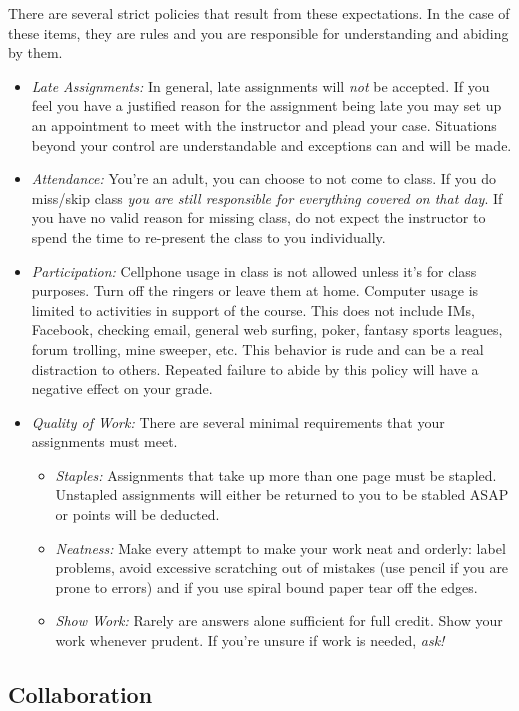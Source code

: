 \documentclass[10pt]{article}
\begin{document}
There are several strict policies that result from these expectations.  In the case of these items, they are rules and you are responsible for understanding and abiding by them.
\begin{itemize}
\item \textit{Late Assignments: }In general, late assignments will \textit{not} be accepted.  If you feel you have a justified reason for the assignment being late you may set up an appointment to meet with the instructor and plead your case.  Situations beyond your control are understandable and exceptions can and will be made.
\item \textit{Attendance: }You're an adult, you can choose to not come to class.  If you do miss/skip class \textit{you are still responsible for everything covered on that day}.  If you have no valid reason for missing class, do not expect the instructor to spend the time to re-present the class to you individually.
\item \textit{Participation: }  Cellphone usage in class is not allowed unless it's for class purposes. Turn off the ringers or leave them at home.  Computer usage is limited to activities in support of the course.  This does not include IMs, Facebook, checking email, general web surfing, poker, fantasy sports leagues, forum trolling, mine sweeper, etc.  This behavior is rude and can be a real distraction to others.  Repeated failure to abide by this policy will have a negative effect on your grade.
\item \textit{Quality of Work:} There are several minimal requirements that your assignments must meet.
\begin{itemize}
\item \textit{Staples: } Assignments that take up more than one page must be stapled.  Unstapled assignments will either be returned to you to be stabled ASAP or points will be deducted.
\item \textit{Neatness: }  Make every attempt to make your work neat and orderly:  label problems, avoid excessive scratching out of mistakes (use pencil if you are prone to errors) and if you use spiral bound paper tear off the edges.
\item \textit{Show Work: } Rarely are answers alone sufficient for full credit.  Show your work whenever prudent.  If you're unsure if work is needed, \textit{ask!}
\end{itemize}
\end{itemize}

\subsection{Collaboration}
\end{document}
